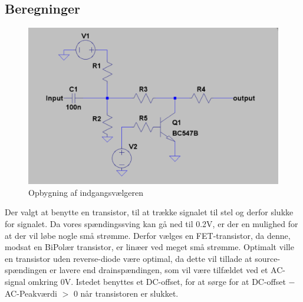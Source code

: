 \subsection*{Beregninger}

\begin{figure}[h]
\centering
\includegraphics[scale=0.4]{implementering/indgangsvaelger/signal-taend-sluk.png}
\caption{Opbygning af indgangsvælgeren}
\label{indgangsvaelger-overordnet}
\end{figure}
Der valgt at benytte en transistor, til at trække signalet til stel og derfor slukke for signalet. Da vores spændingssving kan gå ned til 0.2V, er der en mulighed  for at der vil løbe nogle små strømme. Derfor vælges en FET-transistor, da denne, modsat en BiPolær transistor, er linæer ved meget små strømme. Optimalt ville en transistor uden reverse-diode være optimal, da dette vil tillade at source-spændingen er lavere end drainspændingen, som vil være tilfældet ved et AC-signal omkring 0V. Istedet benyttes et DC-offset, for at sørge for at DC-offset $-$ AC-Peakværdi $>$ 0 når transistoren er slukket.

